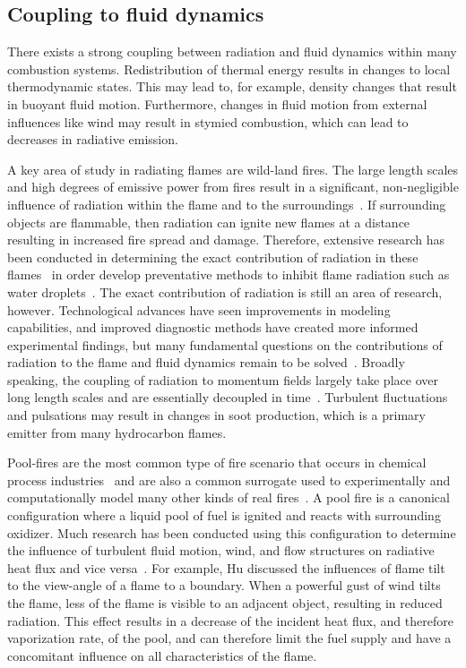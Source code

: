 
\subsection{Coupling to fluid dynamics}
There exists a strong coupling between radiation and fluid dynamics within many combustion systems. Redistribution of thermal energy results in changes to local thermodynamic states. This may lead to, for example, density changes that result in buoyant fluid motion. Furthermore, changes in fluid motion from external influences like wind may result in stymied combustion, which can lead to decreases in radiative emission.

A key area of study in radiating flames are wild-land fires. The large length scales and high degrees of emissive power from fires result in a significant, non-negligible influence of radiation within the flame and to the surroundings~\cite{Drysdale2011AnDynamics}. If surrounding objects are flammable, then radiation can ignite new flames at a distance resulting in increased fire spread and damage. Therefore, extensive research has been conducted in determining the exact contribution of radiation in these flames~\cite{Sacadura2005RadiativeScience} in order develop preventative methods to inhibit flame radiation such as water droplets~\cite{Wu2018RadiationStudy}. 
The exact contribution of radiation is still an area of research, however. Technological advances have seen improvements in modeling capabilities, and  improved diagnostic methods have created more informed experimental findings, but many fundamental questions on the contributions of radiation to the flame and fluid dynamics remain to be solved~\cite{Finney2013OnSpread}. Broadly speaking, the coupling of radiation to momentum fields largely take place over long length scales and are essentially decoupled in time~\cite{Tieszen}. Turbulent fluctuations and pulsations may result in changes in soot production, which is a primary emitter from many hydrocarbon flames. 


Pool-fires are the most common type of fire scenario that occurs in chemical process industries~\cite{Miao2014AccidentDike} and are also a common surrogate used to experimentally and computationally model many other kinds of real fires~\cite{Chen2023PoolAdvances}. A pool fire is a canonical configuration where a liquid pool of fuel is ignited and reacts with surrounding oxidizer. Much research has been conducted using this configuration to determine the influence of turbulent fluid motion, wind, and flow structures on radiative heat flux and vice versa~\cite{Chen2023PoolAdvances}.
For example, Hu discussed the influences of flame tilt to the view-angle of a flame to a boundary. When a powerful gust of wind tilts the flame, less of the flame is visible to an adjacent object, resulting in reduced radiation. This effect results in a decrease of the incident heat flux, and therefore vaporization rate, of the pool, and can therefore limit the fuel supply and have a concomitant influence on all characteristics of the flame.

